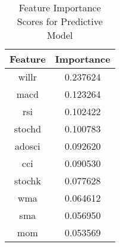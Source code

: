 \begin{table*}[h]
\centering
\caption{Feature Importance Scores for Predictive Model}
\label{tab:table2}
\begingroup
\setlength{\tabcolsep}{10pt}
\renewcommand{\arraystretch}{1.1}%
\begin{tabular}{cc}
    \hline
    \textbf{Feature} & \textbf{Importance} \\
    \hline
    willr   & 0.237624 \\
    macd    & 0.123264 \\
    rsi     & 0.102422 \\
    stochd  & 0.100783 \\
    adosci  & 0.092620 \\
    cci     & 0.090530 \\
    stochk  & 0.077628 \\
    wma     & 0.064612 \\
    sma     & 0.056950 \\
    mom     & 0.053569 \\
    \hline
\end{tabular}
\endgroup
\end{table*}